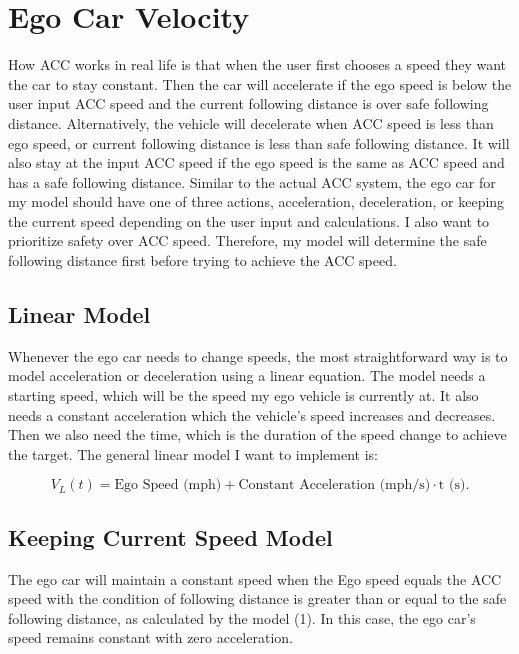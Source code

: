 \documentclass[12pt]{article}
\begin{document}
\section*{Ego Car Velocity}
How ACC works in real life is that when the user first chooses a speed they want the car to stay constant. Then the car will accelerate if the ego speed is below the user input ACC speed and the current following distance is over safe following distance. Alternatively, the vehicle will decelerate when ACC speed is less than ego speed, or current following distance is less than safe following distance. It will also stay at the input ACC speed if the ego speed is the same as ACC speed and has a safe following distance. 
Similar to the actual ACC system, the ego car for my model should have one of three actions, acceleration, deceleration, or keeping the current speed depending on the user input and calculations. I also want to prioritize safety over ACC speed. Therefore, my model will determine the safe following distance first before trying to achieve the ACC speed. 

\subsection*{Linear Model}
Whenever the ego car needs to change speeds, the most straightforward way is to model acceleration or deceleration using a linear equation. The model needs a starting speed, which will be the speed my ego vehicle is currently at. It also needs a constant acceleration which the vehicle’s speed increases and decreases. Then we also need the time, which is the duration of the speed change to achieve the target. The general linear model I want to implement is:

\begin{equation}
V_L(t) = \text{Ego Speed (mph)} +  \text{Constant Acceleration (mph/s)} \cdot \text{t (s)}.
\label{eq:velocity_equation}
\end{equation}



\subsection*{Keeping Current Speed Model} 
The ego car will maintain a constant speed when the Ego speed equals the ACC speed with the condition of following distance is greater than or equal to the safe following distance, as calculated by the model (1). In this case, the ego car’s speed remains constant with zero acceleration.
\end{document}
